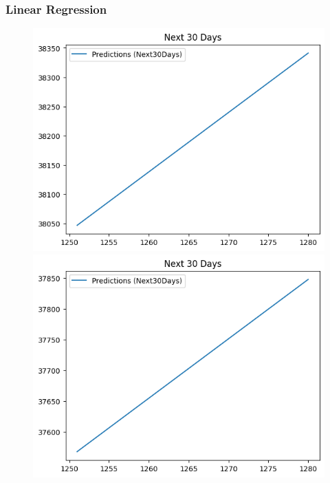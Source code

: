 \subsubsection{Linear Regression}
\begin{figure}[H]
    \centering
    \begin{minipage}{0.15\textwidth}
    \centering
    \includegraphics[width=1\textwidth]{resources/chapter-5/predicted/BIDV_LinearRegression_7-3 30 DAYS.png}
    \end{minipage}
    \hfill
    \begin{minipage}{0.15\textwidth}
    \centering
    \includegraphics[width=1\textwidth]{resources/chapter-5/predicted/BIDV_LinearRegression_8-2 30 DAYS.png}

\end{minipage}
\end{figure}
